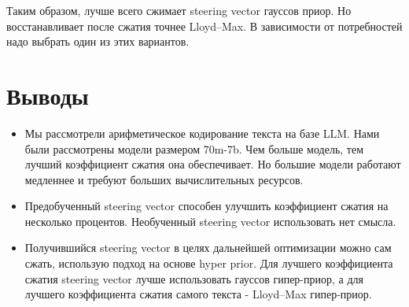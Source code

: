 \documentclass[a4paper,11pt]{article}
\begin{document}
Таким образом, лучше всего сжимает steering vector гауссов приор. Но восстанавливает после сжатия точнее Lloyd–Max. В зависимости от потребностей надо выбрать один из этих вариантов.

\section*{Выводы}

\begin{itemize}
  \item Мы рассмотрели арифметическое кодирование текста на базе LLM. Нами были рассмотрены модели размером 70m-7b. Чем больше модель, тем лучший коэффициент сжатия она обеспечивает. Но большие модели работают медленнее и требуют больших вычислительных ресурсов.
  \item Предобученный steering vector способен улучшить коэффициент сжатия на несколько процентов. Необученный steering vector использовать нет смысла.
  \item Получившийся steering vector в целях дальнейшей оптимизации можно сам сжать, использую подход на основе hyper prior. Для лучшего коэффициента сжатия steering vector лучше использовать гауссов гипер-приор, а для лучшего коэффициента сжатия самого текста - Lloyd–Max гипер‑приор.
\end{itemize}
\end{document}
